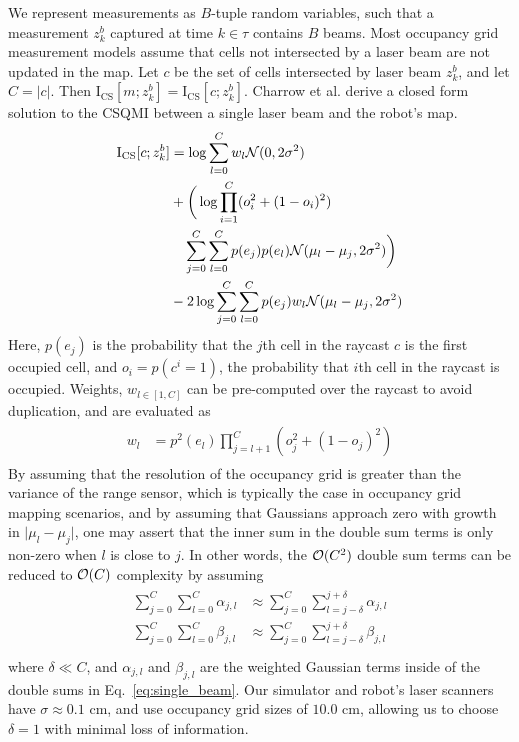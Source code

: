 We represent measurements as $B$-tuple random variables, such that a measurement
$z_{k}^{b}$ captured at time $k \in \tau$ contains $B$ beams. Most occupancy grid
measurement models assume that cells not intersected
by a laser beam are not updated in the map. Let $c$ be the set of cells
intersected by laser beam $z_{k}^{b}$, and let $C = \vert c \vert$. Then
$\text{I}_{\text{CS}}[m; z_{k}^{b}] =
\text{I}_{\text{CS}}[c; z_{k}^{b}]$. Charrow et al. \cite{charrow15} derive a closed form
solution to the CSQMI between
a single laser beam and the robot's map.
%
\begin{align}
  \begin{split}
    \text{I}_{\text{CS}}
    [
      c;
      z_{k}^{b}
    ]
    &=
    \log
    \sum_{l=0}^{C} w_{l}
    \mc{N}(0, 2\sigma^{2}) \\
    &+ \bigg(\log
    \prod_{i=1}^{C}
    (o_{i}^{2} + (1 - o_{i})^{2}) \\
    &\ \ \ \sum_{j=0}^{C}
    \sum_{l=0}^{C}
    p(e_{j})
    p(e_{l})
    \mc{N}(\mu_{l} - \mu_{j}, 2\sigma^{2}) \bigg)\\
    &-2\log
    \sum_{j=0}^{C}
    \sum_{l=0}^{C}
    p(e_{j}) w_{l}
    \mc{N}(\mu_{l} - \mu_{j}, 2\sigma^{2})
    \label{eq:single_beam}
  \end{split}
\end{align}
%
Here, $p(e_j)$ is the probability that the $j$th cell in the raycast $c$ is the
first occupied cell, and $o_i = p(c^{i} = 1)$, the probability that $i$th cell
in the raycast is occupied. Weights, $w_{l \in [1, C]}$ can be pre-computed over
the raycast to avoid duplication, and are evaluated as
%
\begin{align}
  \begin{split}
    w_{l} &=
    p^{2}(e_{l})
    \prod_{j=l+1}^{C}
    (o_{j}^{2} + (1 - o_{j})^{2})
  \end{split}
\end{align}
%
By assuming that the resolution of the occupancy grid is greater than the
variance of the range sensor, which is typically the case in occupancy grid
mapping scenarios, and by assuming that Gaussians approach zero with growth in $\vert \mu_{l} -
\mu_{j} \vert$, one may assert that the inner sum in the double sum terms is
only non-zero when $l$ is close to $j$. In other words, the $\mathcal{O}(C^2)$ double
sum terms can be reduced to $\mathcal{O}(C)$ complexity by assuming
%
\begin{align}
  \begin{split}
    \sum_{j=0}^{C}
    \sum_{l=0}^{C}
    \alpha_{j, l}
    &\approx
    \sum_{j=0}^{C}
    \sum_{l=j-\delta}^{j+\delta}
    \alpha_{j, l} \\
    \sum_{j=0}^{C}
    \sum_{l=0}^{C}
    \beta_{j, l}
    &\approx
    \sum_{j=0}^{C}
    \sum_{l=j-\delta}^{j+\delta}
    \beta_{j, l}\\
  \end{split}
\end{align}
%
where $\delta \ll C$, and $\alpha_{j,l}$ and $\beta_{j, l}$ are the weighted Gaussian terms inside
of the double sums in Eq.~\eqref{eq:single_beam}. Our simulator and robot's
laser scanners have $\sigma \approx 0.1$ cm, and use occupancy grid sizes of
$10.0$ cm, allowing us to choose $\delta = 1$ with minimal loss of information.

